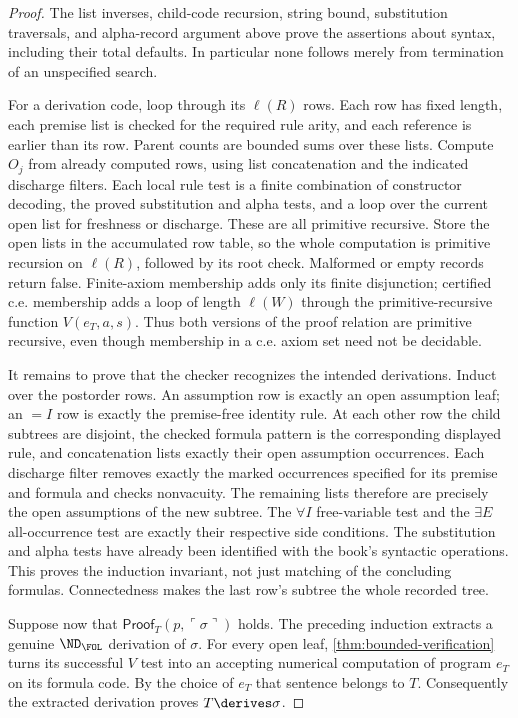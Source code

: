 \begin{proof}
The list inverses, child-code recursion, string bound, substitution
traversals, and alpha-record argument above prove the assertions about
syntax, including their total defaults.  In particular none follows merely
from termination of an unspecified search.

For a derivation code, loop through its \(\ell(R)\) rows.  Each row has
fixed length, each premise list is checked for the required rule arity,
and each reference is earlier than its row.  Parent counts are bounded
sums over these lists.  Compute \(O_j\) from already computed rows,
using list concatenation and the indicated discharge filters.  Each local
rule test is a finite combination of constructor decoding, the proved
substitution and alpha tests, and a loop over the current open list for
freshness or discharge.  These are all primitive recursive.  Store the
open lists in the accumulated row table, so the whole computation is
primitive recursion on \(\ell(R)\), followed by its root check.
Malformed or empty records return false.  Finite-axiom membership adds
only its finite disjunction; certified c.e. membership adds a loop of
length \(\ell(W)\) through the primitive-recursive function
\(V(e_T,a,s)\).  Thus both versions of the proof relation are primitive
recursive, even though membership in a c.e. axiom set need not be decidable.

It remains to prove that the checker recognizes the intended derivations.
Induct over the postorder rows.  An assumption row is exactly an open
assumption leaf; an \(=I\) row is exactly the premise-free identity rule.
At each other row the child subtrees are disjoint, the checked formula
pattern is the corresponding displayed rule, and concatenation lists
exactly their open assumption occurrences.  Each discharge filter removes
exactly the marked occurrences specified for its premise and formula and
checks nonvacuity.  The remaining lists therefore are precisely the open
assumptions of the new subtree.  The \(\forall I\) free-variable test
and the \(\exists E\) all-occurrence test are exactly their respective
side conditions.  The substitution and alpha tests have already been
identified with the book's syntactic operations.  This proves the
induction invariant, not just matching of the concluding formulas.
Connectedness makes the last row's subtree the whole recorded tree.

Suppose now that \(\mathsf{Proof}_T(p,\ulcorner\sigma\urcorner)\)
holds.  The preceding induction extracts a genuine
\(\ND_{\FOL}\) derivation of \(\sigma\).  For every open leaf,
\cref{thm:bounded-verification} turns its successful \(V\) test into
an accepting numerical computation of program \(e_T\) on its formula
code.  By the choice of \(e_T\) that sentence belongs to \(T\).
Consequently the extracted derivation proves \(T\derives\sigma\).


\end{proof}
